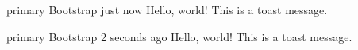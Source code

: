 \documentclass[12pt, a4paper]{article}
\begin{document}
\begin{toast}
    {primary}
    {Bootstrap}
    {just now}
    {Hello, world! This is a toast message.}
\end{toast}

\begin{toast}
    {primary}
    {Bootstrap}
    {2 seconds ago}
    {Hello, world! This is a toast message.}
\end{toast}
\end{document}
